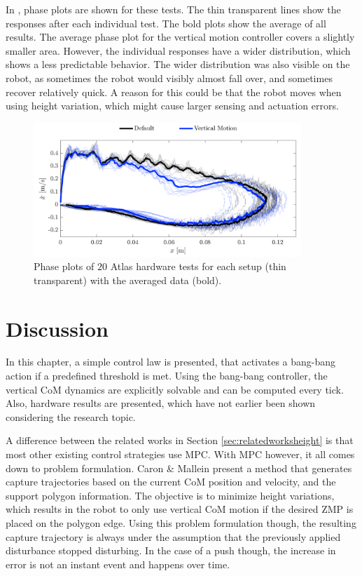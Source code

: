 In , phase plots are shown for these tests. The thin transparent lines show the responses after each individual test. The bold plots show the average of all results. The average phase plot for the vertical motion controller covers a slightly smaller area. However, the individual responses have a wider distribution, which shows a less predictable behavior. The wider distribution was also visible on the robot, as sometimes the robot would visibly almost fall over, and sometimes recover relatively quick. A reason for this could be that the robot moves when using height variation, which might cause larger sensing and actuation errors.

\begin{figure}
\centering
\includegraphics[width=0.9\textwidth]{STYLESTUFF/atlasphaseHW.png}
\caption{Phase plots of $20$ Atlas hardware tests for each setup (thin transparent) with the averaged data (bold).}
\label{fig:atlasphaseHW}
\end{figure}

\section{Discussion}
In this chapter, a simple control law is presented, that activates a bang-bang action if a predefined threshold is met. Using the bang-bang controller, the vertical \ac{CoM} dynamics are explicitly solvable and can be computed every tick. Also, hardware results are presented, which have not earlier been shown considering the research topic. 

A difference between the related works in Section \ref{sec:relatedworksheight} is that most other existing control strategies use \ac{MPC}. With \ac{MPC} however, it all comes down to problem formulation. Caron \& Mallein \cite{caron2018balance} present a method that generates capture trajectories based on the current \ac{CoM} position and velocity, and the support polygon information. The objective is to minimize height variations, which results in the robot to only use vertical \ac{CoM} motion if the desired \ac{ZMP} is placed on the polygon edge. Using this problem formulation though, the resulting capture trajectory is always under the assumption that the previously applied disturbance stopped disturbing. In the case of a push though, the increase in error is not an instant event and happens over time.

